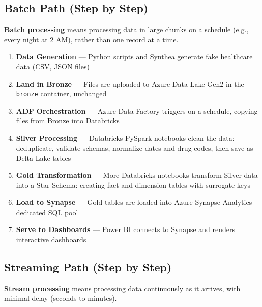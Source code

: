 \documentclass[12pt, a4paper, oneside]{report}
\begin{document}
\subsection{Batch Path (Step by Step)}

\textbf{Batch processing} means processing data in large chunks on a schedule (e.g., every night at 2 AM), rather than one record at a time.

\begin{enumerate}[label=\textcolor{primary}{\textbf{Step \arabic*:}}]
    \item \textbf{Data Generation} --- Python scripts and Synthea generate fake healthcare data (CSV, JSON files)
    \item \textbf{Land in Bronze} --- Files are uploaded to Azure Data Lake Gen2 in the \texttt{bronze} container, unchanged
    \item \textbf{ADF Orchestration} --- Azure Data Factory triggers on a schedule, copying files from Bronze into Databricks
    \item \textbf{Silver Processing} --- Databricks PySpark notebooks clean the data: deduplicate, validate schemas, normalize dates and drug codes, then save as Delta Lake tables
    \item \textbf{Gold Transformation} --- More Databricks notebooks transform Silver data into a Star Schema: creating fact and dimension tables with surrogate keys
    \item \textbf{Load to Synapse} --- Gold tables are loaded into Azure Synapse Analytics dedicated SQL pool
    \item \textbf{Serve to Dashboards} --- Power BI connects to Synapse and renders interactive dashboards
\end{enumerate}

\subsection{Streaming Path (Step by Step)}

\textbf{Stream processing} means processing data continuously as it arrives, with minimal delay (seconds to minutes).
\end{document}
